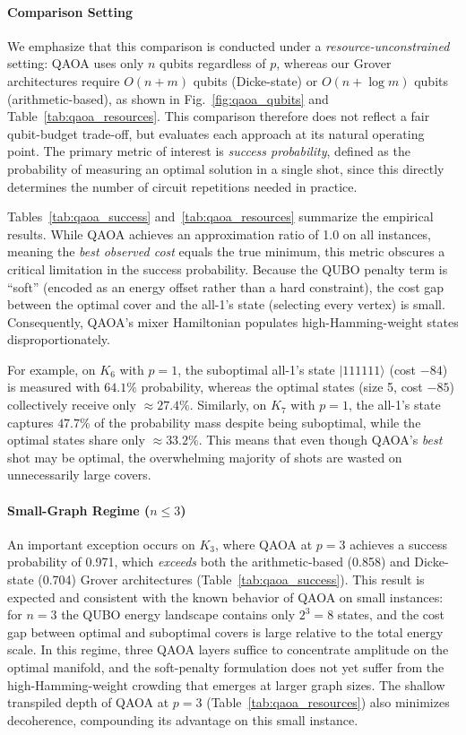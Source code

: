 \documentclass{ieeeaccess}
\begin{document}
\paragraph{Comparison Setting}
We emphasize that this comparison is conducted under a
\emph{resource-unconstrained} setting: QAOA uses only $n$
qubits regardless of $p$, whereas our Grover architectures
require $O(n+m)$ qubits (Dicke-state) or $O(n + \log m)$
qubits (arithmetic-based), as shown in
Fig.~\ref{fig:qaoa_qubits} and
Table~\ref{tab:qaoa_resources}. This comparison therefore
does not reflect a fair qubit-budget trade-off, but
evaluates each approach at its natural operating point.
The primary metric of interest is \emph{success
probability}, defined as the probability of measuring an
optimal solution in a single shot, since this directly
determines the number of circuit repetitions needed in
practice.

Tables~\ref{tab:qaoa_success} and~\ref{tab:qaoa_resources}
summarize the empirical results. While QAOA achieves an
approximation ratio of 1.0 on all instances, meaning the
\emph{best observed cost} equals the true minimum, this
metric obscures a critical limitation in the success
probability. Because the QUBO penalty term is ``soft''
(encoded as an energy offset rather than a hard
constraint), the cost gap between the optimal cover and
the all-1's state (selecting every vertex) is small.
Consequently, QAOA's mixer Hamiltonian populates
high-Hamming-weight states disproportionately.

For example, on $K_6$ with $p=1$, the suboptimal all-1's
state $|111111\rangle$ (cost $-84$) is measured with
$64.1\%$ probability, whereas the optimal states (size 5,
cost $-85$) collectively receive only $\approx 27.4\%$.
Similarly, on $K_7$ with $p=1$, the all-1's state
captures $47.7\%$ of the probability mass despite being
suboptimal, while the optimal states share only
$\approx 33.2\%$. This means that even though QAOA's
\emph{best} shot may be optimal, the overwhelming majority
of shots are wasted on unnecessarily large covers.

\paragraph{Small-Graph Regime ($n \leq 3$)}
An important exception occurs on $K_3$, where QAOA at
$p = 3$ achieves a success probability of 0.971, which
\emph{exceeds} both the arithmetic-based (0.858) and
Dicke-state (0.704) Grover architectures
(Table~\ref{tab:qaoa_success}). This result is expected
and consistent with the known behavior of QAOA on small
instances: for $n = 3$ the QUBO energy landscape contains
only $2^3 = 8$ states, and the cost gap between optimal
and suboptimal covers is large relative to the total
energy scale. In this regime, three QAOA layers suffice
to concentrate amplitude on the optimal manifold, and the
soft-penalty formulation does not yet suffer from the
high-Hamming-weight crowding that emerges at larger graph
sizes. The shallow transpiled depth of QAOA at $p=3$
(Table~\ref{tab:qaoa_resources}) also minimizes
decoherence, compounding its advantage on this small
instance.
\end{document}
